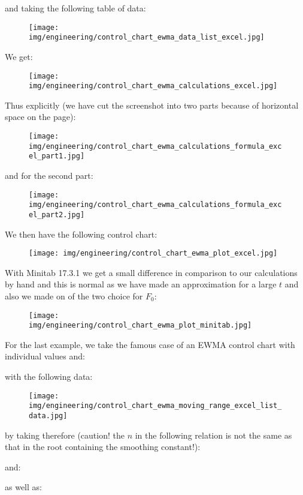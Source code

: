 	and taking the following table of data:
	\begin{figure}[H]
		\centering
		\texttt{[image: img/engineering/control\_chart\_ewma\_data\_list\_excel.jpg]}
	\end{figure}
	We get:
	\begin{figure}[H]
		\centering
		\texttt{[image: img/engineering/control\_chart\_ewma\_calculations\_excel.jpg]}
	\end{figure}
	Thus explicitly (we have cut the screenshot into two parts because of horizontal space on the page):
	\begin{figure}[H]
		\centering
		\texttt{[image: img/engineering/control\_chart\_ewma\_calculations\_formula\_excel\_part1.jpg]}
	\end{figure}
	and for the second part:
	\begin{figure}[H]
		\centering
		\texttt{[image: img/engineering/control\_chart\_ewma\_calculations\_formula\_excel\_part2.jpg]}
	\end{figure}
	We then have the following control chart:
	\begin{figure}[H]
		\centering
		\texttt{[image: img/engineering/control\_chart\_ewma\_plot\_excel.jpg]}
	\end{figure}
	With Minitab 17.3.1 we get a small difference in comparison to our calculations by hand and this is normal as we have made an approximation for a large $t$ and also we made on of the two choice for $F_0$:
	\begin{figure}[H]
		\centering
		\texttt{[image: img/engineering/control\_chart\_ewma\_plot\_minitab.jpg]}
	\end{figure}
	For the last example, we take the famous case of an EWMA control chart with individual values and:
	
	with the following data:
	\begin{figure}[H]
		\centering
		\texttt{[image: img/engineering/control\_chart\_ewma\_moving\_range\_excel\_list\_data.jpg]}
	\end{figure}
	by taking therefore (caution! the $n$ in the following relation is not the same as that in the root containing the smoothing constant!):
	
	and:
	
	as well as:
	
